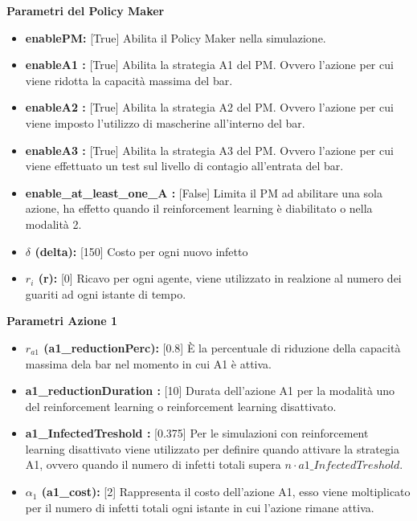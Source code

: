 \documentclass{article}
\begin{document}
{    \textbf{Parametri del Policy Maker}
    \begin{itemize}
        \item \textbf{enablePM:} [True] Abilita il Policy Maker nella simulazione.
        \item \textbf{enableA1 :} [True] Abilita la strategia A1 del PM. Ovvero l'azione per cui viene ridotta la capacità massima del bar.
        \item \textbf{enableA2 :} [True] Abilita la strategia A2 del PM. Ovvero l'azione per cui viene imposto l'utilizzo di mascherine all'interno del bar.
        \item \textbf{enableA3 :} [True] Abilita la strategia A3 del PM. Ovvero l'azione per cui viene effettuato un test sul livello di contagio all'entrata del bar.
        \item \textbf{enable\_at\_least\_one\_A :} [False] Limita il PM ad abilitare una sola azione, ha effetto quando il reinforcement learning è diabilitato o nella modalità 2.
        \item \textbf{$\delta$ (delta):} [150] Costo per ogni nuovo infetto
        \item \textbf{$r_{i}$ (r):} [0] Ricavo per ogni agente, viene utilizzato in realzione al numero dei guariti ad ogni istante di tempo.\newline
    \end{itemize}

    \textbf{Parametri Azione 1}
    \begin{itemize}
        \item \textbf{$r_{a1}$ (a1\_reductionPerc):} [0.8] È la percentuale di riduzione della capacità massima dela bar nel momento in cui A1 è attiva.
        \item \textbf{a1\_reductionDuration :} [10] Durata dell'azione A1 per la modalità uno del reinforcement learning o reinforcement learning disattivato.
        \item \textbf{a1\_InfectedTreshold :} [0.375] Per le simulazioni con reinforcement learning disattivato viene utilizzato per definire quando attivare la strategia A1, ovvero quando il numero di infetti totali supera $n \cdot a1\_InfectedTreshold$.
        \item \textbf{$\alpha_{1}$ (a1\_cost):} [2] Rappresenta il costo dell'azione A1, esso viene moltiplicato per il numero di infetti totali ogni istante in cui l'azione rimane attiva.\newline
    \end{itemize}

}
\end{document}
